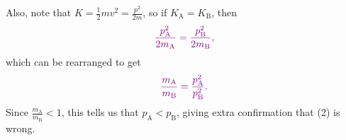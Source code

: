 \documentclass[]{article}
\begin{document}
\begin{TeacherMargin}
\begin{enumerate}[(1)]
	{\color{violet}Also, note that $K=\frac{1}{2}mv^{2}=\frac{p^{2}}{2m}$, so if $K_{\text{A}} = K_{\text{B}}$, then}
	\begin{align*}
		\color{violet}
		\frac{p_{\text{A}}^{2}}{2m_{\text{A}}} = \frac{p_{\text{B}}^{2}}{2m_{\text{B}}},
	\end{align*}
	{\color{violet}which can be rearranged to get}
	\begin{align*}
		\color{violet}
		\frac{m_{\text{A}}}{m_{\text{B}}} = \frac{p_{\text{A}}^{2}}{p_{\text{B}}^{2}}.
	\end{align*}
	{\color{violet}Since $\frac{m_{\text{A}}}{m_{\text{B}}} < 1$, this tells us that $p_{\text{A}}<p_{\text{B}}$, giving extra confirmation that (2) is wrong.}
\end{enumerate}
\end{TeacherMargin}
\begin{PresentSpace}
\vspace{-10pt}

\end{PresentSpace}
\end{document}
